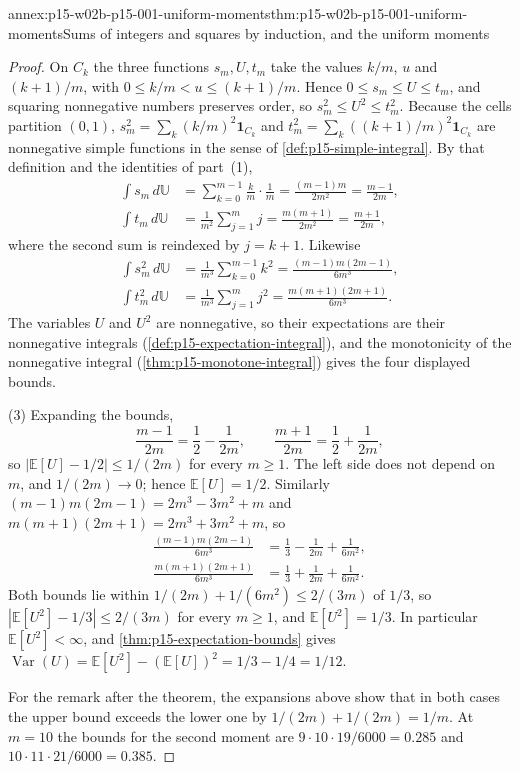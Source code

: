 \begin{annexitem}{annex:p15-w02b-p15-001-uniform-moments}{thm:p15-w02b-p15-001-uniform-moments}{Sums of integers and squares by induction, and the uniform moments}
\begin{proof}
On \(C_k\) the three functions \(s_m,U,t_m\) take the values
\(k/m\), \(u\) and \((k+1)/m\), with \(0\leq k/m<u\leq(k+1)/m\). Hence
\(0\leq s_m\leq U\leq t_m\), and squaring nonnegative numbers preserves
order, so \(s_m^2\leq U^2\leq t_m^2\). Because the cells partition
\((0,1)\), \(s_m^2=\sum_k(k/m)^2\mathbf1_{C_k}\) and
\(t_m^2=\sum_k((k+1)/m)^2\mathbf1_{C_k}\) are nonnegative simple
functions in the sense of \cref{def:p15-simple-integral}. By that
definition and the identities of part~(1),
\[
 \begin{aligned}
 \int s_m\,d\mathbb U&=\sum_{k=0}^{m-1}\frac km\cdot\frac1m
   =\frac{(m-1)m}{2m^2}=\frac{m-1}{2m},\\
 \int t_m\,d\mathbb U&=\frac1{m^2}\sum_{j=1}^{m}j
   =\frac{m(m+1)}{2m^2}=\frac{m+1}{2m},
 \end{aligned}
\]
where the second sum is reindexed by \(j=k+1\). Likewise
\[
 \begin{aligned}
 \int s_m^2\,d\mathbb U&=\frac1{m^3}\sum_{k=0}^{m-1}k^2
   =\frac{(m-1)m(2m-1)}{6m^3},\\
 \int t_m^2\,d\mathbb U&=\frac1{m^3}\sum_{j=1}^{m}j^2
   =\frac{m(m+1)(2m+1)}{6m^3}.
 \end{aligned}
\]
The variables \(U\) and \(U^2\) are nonnegative, so their expectations
are their nonnegative integrals (\cref{def:p15-expectation-integral}),
and the monotonicity of the nonnegative integral
(\cref{thm:p15-monotone-integral}) gives the four displayed bounds.

(3) Expanding the bounds,
\[
 \frac{m-1}{2m}=\frac12-\frac1{2m},\qquad
 \frac{m+1}{2m}=\frac12+\frac1{2m},
\]
so \(|\mathbb E[U]-1/2|\leq1/(2m)\) for every \(m\geq1\). The left
side does not depend on \(m\), and \(1/(2m)\to0\); hence
\(\mathbb E[U]=1/2\). Similarly
\((m-1)m(2m-1)=2m^3-3m^2+m\) and \(m(m+1)(2m+1)=2m^3+3m^2+m\), so
\[
 \begin{aligned}
 \frac{(m-1)m(2m-1)}{6m^3}&=\frac13-\frac1{2m}+\frac1{6m^2},\\
 \frac{m(m+1)(2m+1)}{6m^3}&=\frac13+\frac1{2m}+\frac1{6m^2}.
 \end{aligned}
\]
Both bounds lie within \(1/(2m)+1/(6m^2)\leq2/(3m)\) of \(1/3\), so
\(|\mathbb E[U^2]-1/3|\leq2/(3m)\) for every \(m\geq1\), and
\(\mathbb E[U^2]=1/3\). In particular \(\mathbb E[U^2]<\infty\), and
\cref{thm:p15-expectation-bounds} gives
\(\operatorname{Var}(U)=\mathbb E[U^2]-(\mathbb E[U])^2
 =1/3-1/4=1/12\).

For the remark after the theorem, the expansions above show that in
both cases the upper bound exceeds the lower one by
\(1/(2m)+1/(2m)=1/m\). At
\(m=10\) the bounds for the second moment are
\(9\cdot10\cdot19/6000=0.285\) and \(10\cdot11\cdot21/6000=0.385\).
\end{proof}
\end{annexitem}


